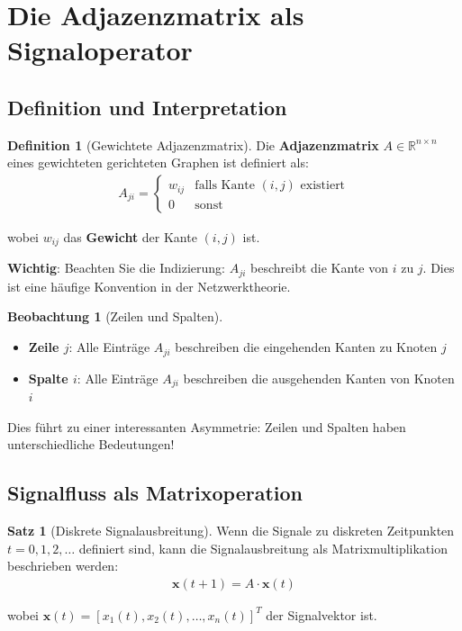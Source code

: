 ﻿\documentclass[a4paper,12pt]{report}
\theoremstyle{definition}
\newtheorem{definition}{Definition}
\newtheorem{satz}{Satz}
\newtheorem{beobachtung}{Beobachtung}
\begin{document}
	\section{Die Adjazenzmatrix als Signaloperator}
	
	\subsection{Definition und Interpretation}
	
	\begin{definition}[Gewichtete Adjazenzmatrix]
		Die \textbf{Adjazenzmatrix} $A \in \mathbb{R}^{n \times n}$ eines gewichteten gerichteten Graphen ist definiert als:
		\begin{align}
			A_{ji} = \begin{cases} w_{ij} & \text{falls Kante } (i,j) \text{ existiert} \\ 0 & \text{sonst} \end{cases}
		\end{align}
		
		wobei $w_{ij}$ das \textbf{Gewicht} der Kante $(i,j)$ ist.
		
		\textbf{Wichtig}: Beachten Sie die Indizierung: $A_{ji}$ beschreibt die Kante von $i$ zu $j$. Dies ist eine häufige Konvention in der Netzwerktheorie.
	\end{definition}
	
	\begin{beobachtung}[Zeilen und Spalten]
		\begin{itemize}
			\item[-] \textbf{Zeile $j$}: Alle Einträge $A_{ji}$ beschreiben die eingehenden Kanten zu Knoten $j$
			\item[-] \textbf{Spalte $i$}: Alle Einträge $A_{ji}$ beschreiben die ausgehenden Kanten von Knoten $i$
		\end{itemize}
		
		Dies führt zu einer interessanten Asymmetrie: Zeilen und Spalten haben unterschiedliche Bedeutungen!
	\end{beobachtung}
	
	\subsection{Signalfluss als Matrixoperation}
	
	\begin{satz}[Diskrete Signalausbreitung]
		Wenn die Signale zu diskreten Zeitpunkten $t = 0, 1, 2, \ldots$ definiert sind, kann die Signalausbreitung als Matrixmultiplikation beschrieben werden:
		\begin{align}
			\mathbf{x}(t+1) = A \cdot \mathbf{x}(t)
		\end{align}
		
		wobei $\mathbf{x}(t) = [x_1(t), x_2(t), \ldots, x_n(t)]^T$ der Signalvektor ist.
	\end{satz}
	
\end{document}
